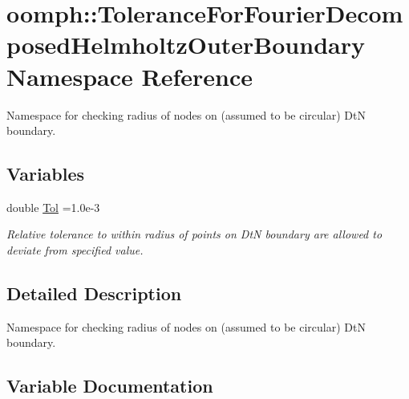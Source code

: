 \hypertarget{namespaceoomph_1_1ToleranceForFourierDecomposedHelmholtzOuterBoundary}{}\section{oomph\+:\+:Tolerance\+For\+Fourier\+Decomposed\+Helmholtz\+Outer\+Boundary Namespace Reference}
\label{namespaceoomph_1_1ToleranceForFourierDecomposedHelmholtzOuterBoundary}


Namespace for checking radius of nodes on (assumed to be circular) DtN boundary.  


\subsection*{Variables}
\begin{DoxyCompactItemize}
\item 
double \hyperlink{namespaceoomph_1_1ToleranceForFourierDecomposedHelmholtzOuterBoundary_a56d158ee0b6e448ce86c142d715b6eaf}{Tol} =1.\+0e-\/3
\begin{DoxyCompactList}\small\item\em Relative tolerance to within radius of points on DtN boundary are allowed to deviate from specified value. \end{DoxyCompactList}\end{DoxyCompactItemize}


\subsection{Detailed Description}
Namespace for checking radius of nodes on (assumed to be circular) DtN boundary. 

\subsection{Variable Documentation}
\mbox{\label{namespaceoomph_1_1ToleranceForFourierDecomposedHelmholtzOuterBoundary_a56d158ee0b6e448ce86c142d715b6eaf}} 
